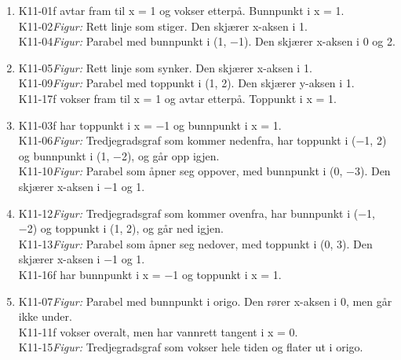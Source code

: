 \documentclass[11pt,a4paper]{article}
\begin{document}
\begin{enumerate}[leftmargin=1.6em, itemsep=0.7em]
\item \begin{minipage}[t]{\linewidth}\textsf{\small K11-01}\quad f avtar fram til x = 1 og vokser etterpå. Bunnpunkt i x = 1. \\ \textsf{\small K11-02}\quad \emph{Figur:} Rett linje som stiger. Den skjærer x-aksen i 1. \\ \textsf{\small K11-04}\quad \emph{Figur:} Parabel med bunnpunkt i (1, −1). Den skjærer x-aksen i 0 og 2.\end{minipage}
\item \begin{minipage}[t]{\linewidth}\textsf{\small K11-05}\quad \emph{Figur:} Rett linje som synker. Den skjærer x-aksen i 1. \\ \textsf{\small K11-09}\quad \emph{Figur:} Parabel med toppunkt i (1, 2). Den skjærer y-aksen i 1. \\ \textsf{\small K11-17}\quad f vokser fram til x = 1 og avtar etterpå. Toppunkt i x = 1.\end{minipage}
\item \begin{minipage}[t]{\linewidth}\textsf{\small K11-03}\quad f har toppunkt i x = −1 og bunnpunkt i x = 1. \\ \textsf{\small K11-06}\quad \emph{Figur:} Tredjegradsgraf som kommer nedenfra, har toppunkt i (−1, 2) og bunnpunkt i (1, −2), og går opp igjen. \\ \textsf{\small K11-10}\quad \emph{Figur:} Parabel som åpner seg oppover, med bunnpunkt i (0, −3). Den skjærer x-aksen i −1 og 1.\end{minipage}
\item \begin{minipage}[t]{\linewidth}\textsf{\small K11-12}\quad \emph{Figur:} Tredjegradsgraf som kommer ovenfra, har bunnpunkt i (−1, −2) og toppunkt i (1, 2), og går ned igjen. \\ \textsf{\small K11-13}\quad \emph{Figur:} Parabel som åpner seg nedover, med toppunkt i (0, 3). Den skjærer x-aksen i −1 og 1. \\ \textsf{\small K11-16}\quad f har bunnpunkt i x = −1 og toppunkt i x = 1.\end{minipage}
\item \begin{minipage}[t]{\linewidth}\textsf{\small K11-07}\quad \emph{Figur:} Parabel med bunnpunkt i origo. Den rører x-aksen i 0, men går ikke under. \\ \textsf{\small K11-11}\quad f vokser overalt, men har vannrett tangent i x = 0. \\ \textsf{\small K11-15}\quad \emph{Figur:} Tredjegradsgraf som vokser hele tiden og flater ut i origo.\end{minipage}

\end{enumerate}
\end{document}
